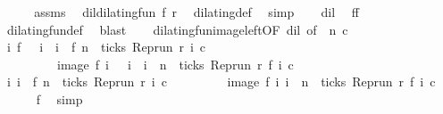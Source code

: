 \begin{isabellebody}
%
\isadelimproof
%
\endisadelimproof
%
\isatagproof
{}\isamarkupfalse%
\ {\isacharminus}\isanewline
\ \ \isamarkupfalse%
\ assms\ \isamarkupfalse%
\ dil{\isacharcolon}{\isacartoucheopen}dilating{\isacharunderscore}fun\ f\ r{\isacartoucheclose}\ \isamarkupfalse%
\ dilating{\isacharunderscore}def\ \isamarkupfalse%
\ simp\isanewline
\ \ \isamarkupfalse%
\ dil\ \isamarkupfalse%
\ f{}{\isacharcolon}{\isacartoucheopen}f\ {}\ {\isacharequal}\ {}{\isacartoucheclose}\ \ \isamarkupfalse%
\ dilating{\isacharunderscore}fun{\isacharunderscore}def\ \isamarkupfalse%
\ blast\isanewline
\ \ \isamarkupfalse%
\ dilating{\isacharunderscore}fun{\isacharunderscore}image{\isacharunderscore}left{\isacharbrackleft}OF\ dil{\isacharcomma}\ of\ {\isacartoucheopen}{}{\isacartoucheclose}\ {\isacartoucheopen}n{\isacartoucheclose}\ {\isacartoucheopen}c{\isacartoucheclose}{\isacharbrackright}\isanewline
\ \ \isamarkupfalse%
\ {\isacartoucheopen}{\isacharbraceleft}i{\isachardot}\ f\ {}\ {\isasymle}\ i\ {\isasymand}\ i\ {\isacharless}\ f\ n\ {\isasymand}\ ticks\ {\isacharparenleft}{\isacharparenleft}Rep{\isacharunderscore}run\ r{\isacharparenright}\ i\ c{\isacharparenright}{\isacharbraceright}\isanewline
\ \ \ \ \ \ \ \ {\isacharequal}\ image\ f\ {\isacharbraceleft}i{\isachardot}\ {}\ {\isasymle}\ i\ {\isasymand}\ i\ {\isacharless}\ n\ {\isasymand}\ ticks\ {\isacharparenleft}{\isacharparenleft}Rep{\isacharunderscore}run\ r{\isacharparenright}\ {\isacharparenleft}f\ i{\isacharparenright}\ c{\isacharparenright}{\isacharbraceright}{\isacartoucheclose}\ \isacommand{{\isachardot}}\isamarkupfalse%
\isanewline
\ \ \isamarkupfalse%
\ {\isacartoucheopen}{\isacharbraceleft}i{\isachardot}\ i\ {\isacharless}\ f\ n\ {\isasymand}\ ticks\ {\isacharparenleft}{\isacharparenleft}Rep{\isacharunderscore}run\ r{\isacharparenright}\ i\ c{\isacharparenright}{\isacharbraceright}\isanewline
\ \ \ \ \ \ \ \ {\isacharequal}\ image\ f\ {\isacharbraceleft}i{\isachardot}\ i\ {\isacharless}\ n\ {\isasymand}\ ticks\ {\isacharparenleft}{\isacharparenleft}Rep{\isacharunderscore}run\ r{\isacharparenright}\ {\isacharparenleft}f\ i{\isacharparenright}\ c{\isacharparenright}{\isacharbraceright}{\isacartoucheclose}\isanewline
\ \ \ \ \isamarkupfalse%
\ f{}\ \isamarkupfalse%
\ simp\isanewline
\ \ \isamarkupfalse%

\end{isabellebody}
